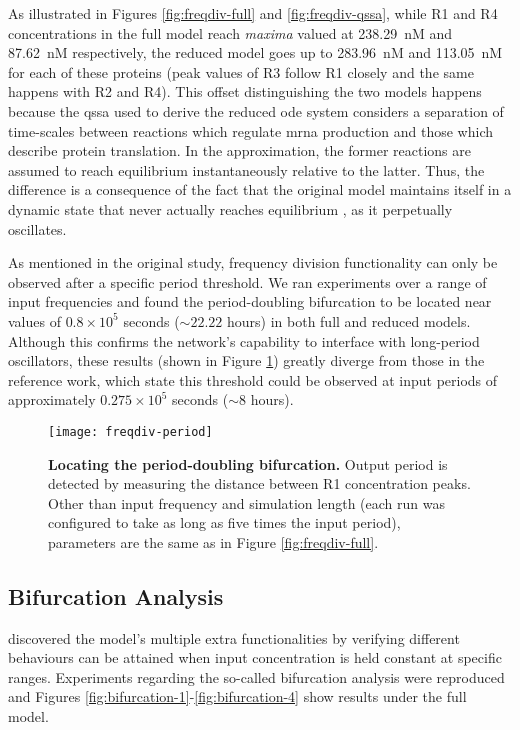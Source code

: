     As illustrated in Figures \ref{fig:freqdiv-full} and \ref{fig:freqdiv-qssa}, while R1 and R4 concentrations in the full model reach \textit{maxima} valued at \SI{238.29}{\nano M} and \SI{87.62}{\nano M} respectively, the reduced model goes up to \SI{283.96}{\nano M} and \SI{113.05}{\nano M} for each of these proteins (peak values of R3 follow R1 closely and the same happens with R2 and R4).
    This offset distinguishing the two models happens because the \ac{qssa} used to derive the reduced \ac{ode} system considers a separation of time-scales between reactions which regulate \acs{mrna} production and those which describe protein translation.
    In the approximation, the former reactions are assumed to reach equilibrium instantaneously relative to the latter.
    Thus, the difference is a consequence of the fact that the original model maintains itself in a dynamic state that never actually reaches equilibrium \cite{ingalls}, as it perpetually oscillates.

    As mentioned in the original study, frequency division functionality can only be observed after a specific period threshold.
    We ran experiments over a range of input frequencies and found the period-doubling bifurcation to be located near values of $0.8 \times 10^5$ seconds ($\sim 22.22$ hours) in both full and reduced models.
    Although this confirms the network's capability to interface with long-period oscillators, these results (shown in Figure \ref{fig:freqdiv-period}) greatly diverge from those in the reference work, which state this threshold could be observed at input periods of approximately $0.275 \times 10^5$ seconds ($\sim 8$ hours).

    \begin{figure}[!htb]
      \centering
      \texttt{[image: freqdiv-period]}
      \caption{\textbf{Locating the period-doubling bifurcation.} Output period is detected by measuring the distance between R1 concentration peaks. Other than input frequency and simulation length (each run was configured to take as long as five times the input period), parameters are the same as in Figure \ref{fig:freqdiv-full}.}
      \label{fig:freqdiv-period}
    \end{figure}


  \subsection{Bifurcation Analysis}

    \citet{multif} discovered the model's multiple extra functionalities by verifying different behaviours can be attained when input concentration is held constant at specific ranges.
    Experiments regarding the so-called bifurcation analysis were reproduced and Figures \ref{fig:bifurcation-1}-\ref{fig:bifurcation-4} show results under the full model.

